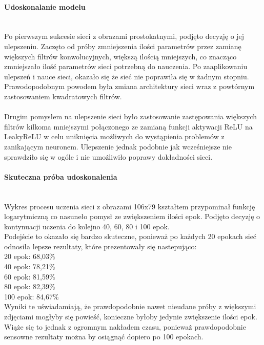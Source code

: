 \paragraph{Udoskonalanie modelu} \mbox{}\\
Po pierwszym sukcesie sieci z obrazami prostokatnymi, podjęto decyzję o jej ulepszeniu.
Zaczęto od próby zmniejszenia ilości parametrów przez zamianę większych filtrów konwolucyjnych,
większą ilością mniejszych, co znacząco zmniejszało ilość parametrów sieci potrzebną do nauczenia.
Po zaaplikowaniu ulepszeń i nauce sieci, okazało się że sieć nie poprawiła się w żadnym
stopniu. Prawodopodobnym powodem była zmiana architektury sieci wraz z powtórnym
zastosowaniem kwadratowych filtrów.\\\\
Drugim pomysłem na ulepszenie sieci było zastosowanie zastępowania większych filtrów
kilkoma mniejszymi połączonego ze zamianą funkcji aktywacji ReLU na LeakyReLU w celu uniknięcia
możliwych do wystąpienia problemów z zanikającym neuronem. Ulepszenie jednak podobnie
jak wcześniejsze nie sprawdziło się w ogóle i nie umożliwiło poprawy dokładności sieci.

\paragraph{Skuteczna próba udoskonalenia} \mbox{}\\
Wykres procesu uczenia sieci z obrazami 106x79 kształtem przypominał funkcję logarytmiczną
co nasuneło pomysł ze zwiększeniem ilości epok. Podjęto decyzję o kontynuacji uczenia
do kolejno 40, 60, 80 i 100 epok.\\
Podejście to okazało się bardzo skuteczne, ponieważ po każdych 20 epokach
sieć odnosiła lepsze rezultaty, które prezentowały się nastepująco:\\
20 epok: 68,03\%\\
40 epok: 78,21\%\\
60 epok: 81,59\%\\
80 epok: 82,39\%\\
100 epok: 84,67\%\\
Wyniki te uświadamiają, że prawdopodobnie nawet nieudane próby z większymi zdjęciami
mogłyby się powieść, konieczne byłoby jedynie zwiększenie ilości epok. Wiąże się to jednak
z ogromnym nakładem czasu, ponieważ prawdopodobnie sensowne rezultaty można by osiągnąć
dopiero po 100 epokach.
